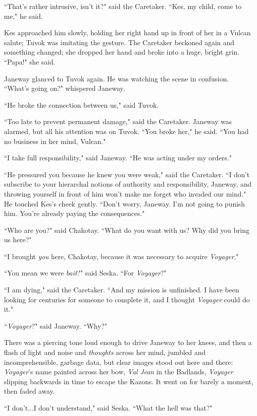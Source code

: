 \documentclass[twoside,letterpaper,12pt]{memoir}
\begin{document}
``That's rather intrusive, isn't it?" said the Caretaker. ``Kes, my child, come to me," he said. 

Kes approached him slowly, holding her right hand up in front of her in a Vulcan salute; Tuvok was imitating the gesture. The Caretaker beckoned again and something changed; she dropped her hand and broke into a huge, bright grin. ``Papa!" she said. 

Janeway glanced to Tuvok again. He was watching the scene in confusion. ``What's going on?" whispered Janeway. 

``He broke the connection between us," said Tuvok. 

``Too late to prevent permanent damage," said the Caretaker. Janeway was alarmed, but all his attention was on Tuvok. ``You broke her," he said. ``You had no business in her mind, Vulcan." 

``I take full responsibility," said Janeway. ``He was acting under my orders." 

``He pressured you because he knew you were weak," said the Caretaker. ``I don't subscribe to your hierarchal notions of authority and responsibility, Janeway, and throwing yourself in front of him won't make me forget who invaded our mind." He touched Kes's cheek gently. ``Don't worry, Janeway. I'm not going to punish him. You're already paying the consequences." 

``Who are you?" said Chakotay. ``What do you want with us? Why did you bring us here?" 

``I brought \textit{you} here, Chakotay, because it was necessary to acquire \textit{Voyager}." 

``You mean we were \textit{bait}?" said Seska. ``For \textit{Voyager}?" 

``I am dying," said the Caretaker. ``And my mission is unfinished. I have been looking for centuries for someone to complete it, and I thought \textit{Voyager} could do it." 

``\textit{Voyager}?" said Janeway. ``Why?" 

There was a piercing tone loud enough to drive Janeway to her knees, and then a flash of light and noise and \textit{thoughts} across her mind, jumbled and incomprehensible, garbage data, but clear images stood out here and there: \textit{Voyager}'s name painted across her bow, \textit{Val Jean} in the Badlands, \textit{Voyager} slipping backwards in time to escape the Kazons. It went on for barely a moment, then faded away. 

``I don't...I don't understand," said Seska. ``What the hell was that?" 
\end{document}
